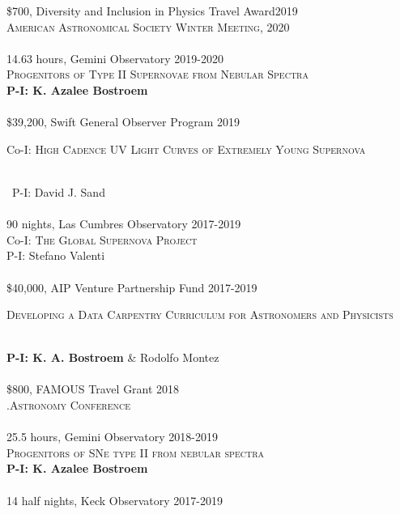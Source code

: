 \documentclass[10pt]{cv}
\begin{document}
\begin{llist}
\$700, Diversity and Inclusion in Physics Travel Award\hfill 2019\\
\textsc{American Astronomical Society Winter Meeting, 2020}\\
\\
14.63 hours, Gemini Observatory \hfill 2019-2020\\
\textsc{Progenitors of Type II Supernovae from Nebular Spectra}\\
\textbf{P-I: K. Azalee Bostroem}\\
\\
\$39,200, Swift General Observer Program \hfill 2019\\
\begin{minipage}[l]{0.7\textwidth}\vspace{0.15cm}
Co-I: \textsc{High Cadence UV Light Curves of Extremely Young Supernova}
\end{minipage}\vspace{0.15cm}\\\
P-I: David J. Sand\\
\\
90 nights, Las Cumbres Observatory \hfill 2017-2019\\
Co-I: \textsc{The Global Supernova Project}\\
P-I: Stefano Valenti \\
\\
\$40,000, AIP Venture Partnership Fund \hfill 2017-2019\\
\begin{minipage}[l]{0.7\textwidth}\vspace{0.15cm}
\textsc{Developing a Data Carpentry Curriculum for Astronomers and Physicists}
\end{minipage}\vspace{0.15cm}\\
{\bf P-I: K. A. Bostroem} \& Rodolfo Montez\\
\\
\$800, FAMOUS Travel Grant \hfill2018\\ 
\textsc{.Astronomy Conference}\\
\\
25.5 hours, Gemini Observatory \hfill 2018-2019\\
\textsc{Progenitors of SNe type II from nebular spectra}\\
{\bf P-I: K. Azalee Bostroem} \\
\\
14 half nights, Keck Observatory \hfill 2017-2019\\

\end{llist}
\end{document}
